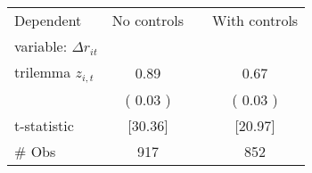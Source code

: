 \begin{tabular}{lccc}
\toprule
Dependent & \multicolumn{1}{c}{No controls} && \multicolumn{1}{c}{With controls} \\
variable: $\Delta r_{it}$       \\
\midrule
trilemma $ z_{i,t}$ &   0.89\sym{***} &&   0.67\sym{***}  \\
& (  0.03 ) && (  0.03 )   \\
t-statistic & [30.36] && [20.97] \\
\# Obs &          917 &&          852 \\
\bottomrule
\end{tabular}
